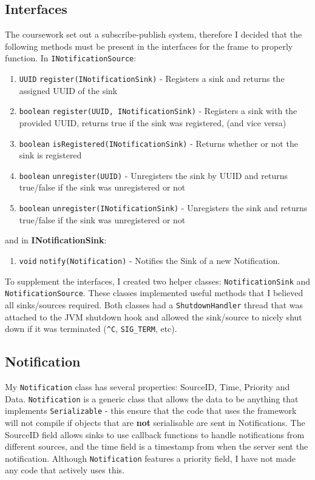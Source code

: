 \documentclass[a4paper]{article}
\begin{document}
\subsection{Interfaces}
The coursework set out a subscribe-publish system, therefore I decided that the following methods must be present in the interfaces for the frame to properly function.
In \texttt{INotificationSource}:
\begin{enumerate}
  \item \texttt{UUID} \texttt{register(INotificationSink)} - Registers a sink and returns the assigned UUID of the sink
  \item \texttt{boolean} \texttt{register(UUID, INotificationSink)} - Registers a sink with the provided UUID, returns true if the sink was registered, (and vice versa)
  \item \texttt{boolean} \texttt{isRegistered(INotificationSink)} - Returns whether or not the sink is registered
  \item \texttt{boolean} \texttt{unregister(UUID)} - Unregisters the sink by UUID and returns true/false if the sink was unregistered or not
  \item \texttt{boolean} \texttt{unregister(INotificationSink)} - Unregisters the sink and returns true/false if the sink was unregistered or not
\end{enumerate}
and in \textbf{INotificationSink}:
\begin{enumerate}
  \item \texttt{void} \texttt{notify(Notification)} - Notifies the Sink of a new Notification.
\end{enumerate}

To supplement the interfaces, I created two helper classes: \texttt{NotificationSink} and \texttt{NotificationSource}.
These classes implemented useful methods that I believed all sinks/sources required.
Both classes had a \texttt{ShutdownHandler} thread that was attached to the JVM shutdown hook and allowed the sink/source to nicely shut down if it was terminated (\texttt{\^{}C}, \texttt{SIG\_TERM}, etc).


\subsection{Notification}
My \texttt{Notification} class has several properties: SourceID, Time, Priority and Data.
\texttt{Notification} is a generic class that allows the data to be anything that implements \texttt{Serializable} -
this ensure that the code that uses the framework will not compile if objects that are \textbf{not} serialisable are sent in Notifications.
The SourceID field allows sinks to use callback functions to handle notifications from different sources, and the time field is a timestamp from when the server sent the notification.
Although \texttt{Notification} features a priority field, I have not made any code that actively uses this.
\end{document}
